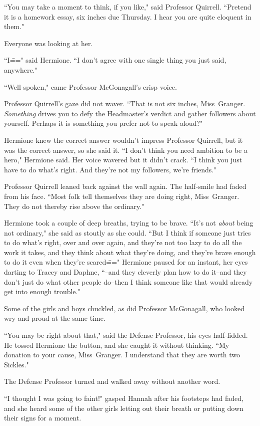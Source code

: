 ``You may take a moment to think, if you like," said Professor Quirrell. ``Pretend it is a homework essay, six inches due Thursday. I hear you are quite eloquent in them."

Everyone was looking at her.

``I\===" said Hermione. ``I don't agree with one single thing you just said, anywhere."

``Well spoken," came Professor McGonagall's crisp voice.

Professor Quirrell's gaze did not waver. ``That is not six inches, Miss~Granger. \emph{Something} drives you to defy the Headmaster's verdict and gather followers about yourself. Perhaps it is something you prefer not to speak aloud?"

Hermione knew the correct answer wouldn't impress Professor Quirrell, but it was the correct answer, so she said it. ``I don't think you need ambition to be a hero," Hermione said. Her voice wavered but it didn't crack. ``I think you just have to do what's right. And they're not my followers, we're friends."

Professor Quirrell leaned back against the wall again. The half-smile had faded from his face. ``Most folk tell themselves they are doing right, Miss~Granger. They do not thereby rise above the ordinary."

Hermione took a couple of deep breaths, trying to be brave. ``It's not \emph{about} being not ordinary," she said as stoutly as she could. ``But I think if someone just tries to do what's right, over and over again, and they're not too lazy to do all the work it takes, and they think about what they're doing, and they're brave enough to do it even when they're scared\===" Hermione paused for an instant, her eyes darting to Tracey and Daphne, ``\---and they cleverly plan how to do it\---and they don't just do what other people do\---then I think someone like that would already get into enough trouble."

Some of the girls and boys chuckled, as did Professor McGonagall, who looked wry and proud at the same time.

``You may be right about that," said the Defense Professor, his eyes half-lidded. He tossed Hermione the button, and she caught it without thinking. ``My donation to your cause, Miss~Granger. I understand that they are worth two Sickles."

The Defense Professor turned and walked away without another word.

``I thought I was going to faint!" gasped Hannah after his footsteps had faded, and she heard some of the other girls letting out their breath or putting down their signs for a moment.

